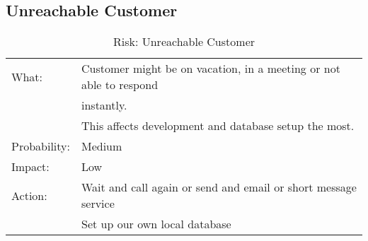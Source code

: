\subsection{Unreachable Customer}
\begin{table}[H]
\begin{tabular}{| l | l |}
	\hline
	What: & Customer might be on vacation, in a meeting or not able to respond\\
	& instantly.\\
	& This affects development and database setup the most.\\ %
	\hline
	Probability: & Medium \\
	\hline
	Impact: & Low \\
	\hline
	Action: & Wait and call again or send and email or short message service\\
	& Set up our own local database\\
	\hline
\end{tabular}
\caption{Risk: Unreachable Customer}
\end{table}
